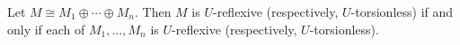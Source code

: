 Let $M \cong M_1 \oplus \cdots \oplus M_n$. Then $M$ is $U$-reflexive (respectively, $U$-torsionless) if and only if each of $M_1, \ldots, M_n$ is $U$-reflexive (respectively, $U$-torsionless).
